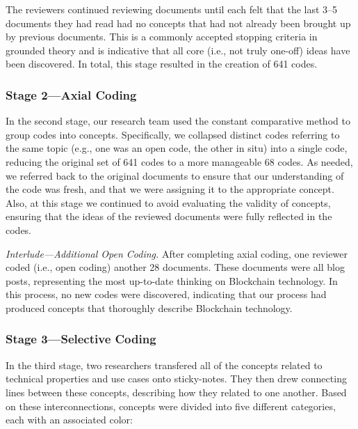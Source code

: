 The reviewers continued reviewing documents until each felt that the last 3--5 documents they had read had no concepts that had not already been brought up by previous documents.
This is a commonly accepted stopping criteria in grounded theory and is indicative that all core (i.e., not truly one-off) ideas have been discovered.
In total, this stage resulted in the creation of 641 codes.

\subsubsection{Stage 2---Axial Coding}
In the second stage, our research team used the constant comparative method to group codes into concepts.
Specifically, we collapsed distinct codes referring to the same topic (e.g., one was an open code, the other in situ) into a single code, reducing the original set of 641 codes to a more manageable 68 codes.
As needed, we referred back to the original documents to ensure that our understanding of the code was fresh, and that we were assigning it to the appropriate concept.
Also, at this stage we continued to avoid evaluating the validity of concepts, ensuring that the ideas of the reviewed documents were fully reflected in the codes.

\textit{Interlude---Additional Open Coding.}
After completing axial coding, one reviewer coded (i.e., open coding) another 28 documents.
These documents were all blog posts, representing the most up-to-date thinking on Blockchain technology.
In this process, no new codes were discovered, indicating that our process had produced concepts that thoroughly describe Blockchain technology.

\subsubsection{Stage 3---Selective Coding}
In the third stage, two researchers transfered all of the concepts related to technical properties and use cases onto sticky-notes.
They then drew connecting lines between these concepts, describing how they related to one another.
Based on these interconnections, concepts were divided into five different categories, each with an associated color:

